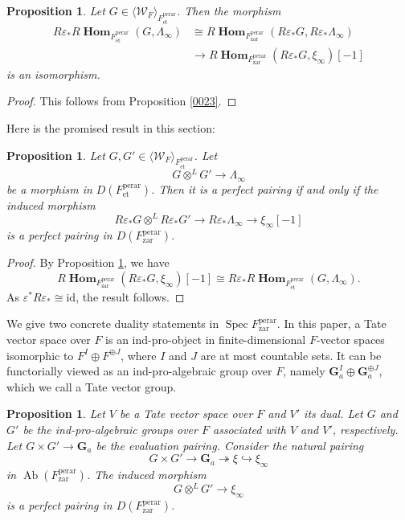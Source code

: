 \documentclass{amsart}
\newtheorem{Prop}[Thm]{Proposition}
\theoremstyle{remark}
\numberwithin{equation}{subsection}
\newcommand{\into}{\hookrightarrow}
\newcommand{\onto}{\twoheadrightarrow}
\newcommand{\tensor}{\mathbin{\otimes}}
\newcommand{\et}{\mathrm{et}}
\newcommand{\zar}{\mathrm{zar}}
\newcommand{\id}{\mathrm{id}}
\newcommand{\Ga}{\mathbf{G}_{a}}
\newcommand{\perar}{\mathrm{perar}}
\newcommand{\alg}[1]{\mathbf{#1}}
\newcommand{\genby}[1]{\langle #1 \rangle}
\DeclareMathOperator{\Spec}{Spec}
\DeclareMathOperator{\Ab}{Ab}
\DeclareMathOperator{\sheafhom}{\alg{Hom}}
\begin{document}
\begin{Prop} \label{0025}
	Let $G \in \genby{\mathcal{W}_{F}}_{F^{\perar}_{\et}}$.
	Then the morphism
		\begin{align*}
					R \varepsilon_{\ast}
					R \sheafhom_{F^{\perar}_{\et}}(G, \Lambda_{\infty})
			&	\cong
					R \sheafhom_{F^{\perar}_{\zar}}(R \varepsilon_{\ast} G, R \varepsilon_{\ast} \Lambda_{\infty})
			\\
			&	\to
					R \sheafhom_{F^{\perar}_{\zar}}(R \varepsilon_{\ast} G, \xi_{\infty})[-1]
		\end{align*}
	is an isomorphism.
\end{Prop}

\begin{proof}
	This follows from
	Proposition \ref{0023}.
\end{proof}

Here is the promised result in this section:

\begin{Prop} \label{0026}
	Let $G, G' \in \genby{\mathcal{W}_{F}}_{F^{\perar}_{\et}}$.
	Let
		\[
				G \tensor^{L} G' \to \Lambda_{\infty}
		\]
	be a morphism in $D(F^{\perar}_{\et})$.
	Then it is a perfect pairing if and only if the induced morphism
		\[
				R \varepsilon_{\ast} G \tensor^{L} R \varepsilon_{\ast} G'
			\to
				R \varepsilon_{\ast} \Lambda_{\infty}
			\to
				\xi_{\infty}[-1]
		\]
	is a perfect pairing in $D(F^{\perar}_{\zar})$.
\end{Prop}

\begin{proof}
	By Proposition \ref{0025},
	we have
		\[
				R \sheafhom_{F^{\perar}_{\zar}}(R \varepsilon_{\ast} G, \xi_{\infty})[-1]
			\cong
				R \varepsilon_{\ast}
				R \sheafhom_{F^{\perar}_{\et}}(G, \Lambda_{\infty}).
		\]
	As $\varepsilon^{\ast} R \varepsilon_{\ast} \cong \id$, the result follows.
\end{proof}

We give two concrete duality statements in $\Spec F^{\perar}_{\zar}$.
In this paper, a Tate vector space over $F$ is
an ind-pro-object in finite-dimensional $F$-vector spaces
isomorphic to $F^{I} \oplus F^{\oplus J}$, where $I$ and $J$ are at most countable sets.
It can be functorially viewed as an ind-pro-algebraic group over $F$,
namely $\Ga^{I} \oplus \Ga^{\oplus J}$,
which we call a Tate vector group.

\begin{Prop} \label{0027}
	Let $V$ be a Tate vector space over $F$
	and $V'$ its dual.
	Let $G$ and $G'$ be the ind-pro-algebraic groups over $F$
	associated with $V$ and $V'$, respectively.
	Let $G \times G' \to \Ga$ be the evaluation pairing.
	Consider the natural pairing
		\[
			G \times G' \to \Ga \onto \xi \into \xi_{\infty}
		\]
	in $\Ab(F^{\perar}_{\zar})$.
	The induced morphism
		\[
			G \tensor^{L} G' \to \xi_{\infty}
		\]
	is a perfect pairing in $D(F^{\perar}_{\zar})$.
\end{Prop}
\end{document}
